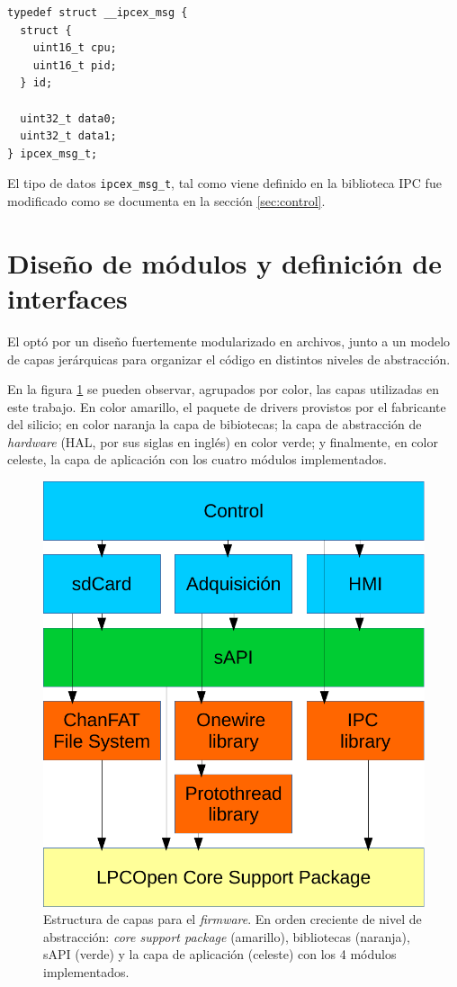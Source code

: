 \begin{lstlisting}[caption={Definición de un nuevo tipo de dato ipcex\_msg\_t para intercambio de mensajes.},label={lst:ipcex_msg_t}]
typedef struct __ipcex_msg {
  struct {
    uint16_t cpu;
    uint16_t pid;
  } id;

  uint32_t data0;
  uint32_t data1;
} ipcex_msg_t;
\end{lstlisting}

El tipo de datos \texttt{ipcex\_msg\_t}, tal como viene definido en la biblioteca IPC fue modificado como se documenta en la sección \ref{sec:control}.

\section{Diseño de módulos y definición de interfaces}
\label{sec:modulos}

El optó por un diseño fuertemente modularizado en archivos, junto a un modelo de capas jerárquicas para organizar el código en distintos niveles de abstracción.  

En la figura \ref{fig:capas} se pueden observar, agrupados por color, las capas utilizadas en este trabajo.  En color amarillo, el paquete de drivers provistos por el fabricante del silicio; en color naranja la capa de bibiotecas; la capa de abstracción de \textit{hardware} (HAL, por sus siglas en inglés) en color verde; y finalmente, en color celeste, la capa de aplicación con los cuatro módulos implementados.   


\begin{figure}[ht]
	\centering
	\includegraphics[width=.5\textwidth]{./Figures/capas.pdf}
	\caption[Estructura de capas para el \textit{firmware}.]{Estructura de capas para el \textit{firmware}. En orden creciente de nivel de abstracción: \textit{core support package} (amarillo), bibliotecas (naranja), sAPI (verde) y la capa de aplicación (celeste) con los 4 módulos implementados.}
	\label{fig:capas}
\end{figure}

